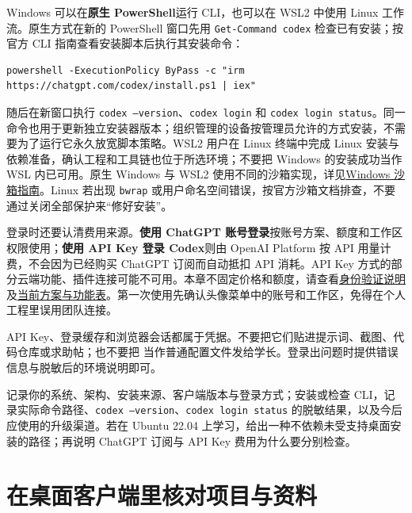 Windows 可以在\textbf{原生 PowerShell}运行 CLI，也可以在 WSL2 中使用 Linux 工作流。原生方式在新的 PowerShell 窗口先用 \texttt{Get-Command codex} 检查已有安装；按官方 CLI 指南查看安装脚本后执行其安装命令：
\begin{lstlisting}[language={}]
powershell -ExecutionPolicy ByPass -c "irm https://chatgpt.com/codex/install.ps1 | iex"
\end{lstlisting}
随后在新窗口执行 \texttt{codex --version}、\texttt{codex login} 和 \texttt{codex login status}。同一命令也用于更新独立安装器版本；组织管理的设备按管理员允许的方式安装，不需要为了运行它永久放宽脚本策略。WSL2 用户在 Linux 终端中完成 Linux 安装与依赖准备，确认工程和工具链也位于所选环境；不要把 Windows 的安装成功当作 WSL 内已可用。原生 Windows 与 WSL2 使用不同的沙箱实现，详见\href{https://learn.chatgpt.com/docs/windows/windows-sandbox}{Windows 沙箱指南}。Linux 若出现 \texttt{bwrap} 或用户命名空间错误，按官方沙箱文档排查，不要通过关闭全部保护来“修好安装”。

登录时还要认清费用来源。\textbf{使用 ChatGPT 账号登录}按账号方案、额度和工作区权限使用；\textbf{使用 API Key 登录 Codex}则由 OpenAI Platform 按 API 用量计费，不会因为已经购买 ChatGPT 订阅而自动抵扣 API 消耗。API Key 方式的部分云端功能、插件连接可能不可用。本章不固定价格和额度，请查看\href{https://learn.chatgpt.com/docs/auth}{身份验证说明}及\href{https://learn.chatgpt.com/docs/pricing}{当前方案与功能表}。第一次使用先确认头像菜单中的账号和工作区，免得在个人工程里误用团队连接。

\begin{note}
API Key、登录缓存和浏览器会话都属于凭据。不要把它们贴进提示词、截图、代码仓库或求助帖；也不要把  当作普通配置文件发给学长。登录出问题时提供错误信息与脱敏后的环境说明即可。
\end{note}

\begin{exercise}\label{ex:ai-desktop-install}
记录你的系统、架构、安装来源、客户端版本与登录方式；安装或检查 CLI，记录实际命令路径、\texttt{codex --version}、\texttt{codex login status} 的脱敏结果，以及今后应使用的升级渠道。若在 Ubuntu 22.04 上学习，给出一种不依赖未受支持桌面安装的路径；再说明 ChatGPT 订阅与 API Key 费用为什么要分别检查。
\end{exercise}

\section{在桌面客户端里核对项目与资料}
\label{sec:ai-desktop-ui}

